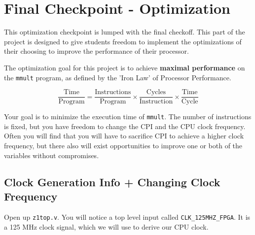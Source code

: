 \documentclass[11pt]{article}
\begin{document}

\pagebreak

\section{Final Checkpoint - Optimization}
This optimization checkpoint is lumped with the final checkoff.
This part of the project is designed to give students freedom to implement the optimizations of their choosing to improve the performance of their processor.

The optimization goal for this project is to achieve \textbf{maximal performance} on the \verb|mmult| program, as defined by the 'Iron Law' of Processor Performance.

\begin{equation*}
\frac{\text{Time}}{\text{Program}} = \frac{\text{Instructions}}{\text{Program}} \times \frac{\text{Cycles}}{\text{Instruction}} \times \frac{\text{Time}}{\text{Cycle}}
\end{equation*}

Your goal is to minimize the execution time of \verb|mmult|.
The number of instructions is fixed, but you have freedom to change the CPI and the CPU clock frequency.
Often you will find that you will have to sacrifice CPI to achieve a higher clock frequency, but there also will exist opportunities to improve one or both of the variables without compromises.

\subsection{Clock Generation Info + Changing Clock Frequency}
Open up \verb|z1top.v|.
You will notice a top level input called \verb|CLK_125MHZ_FPGA|.
It is a 125 MHz clock signal, which we will use to derive our CPU clock.
\end{document}
